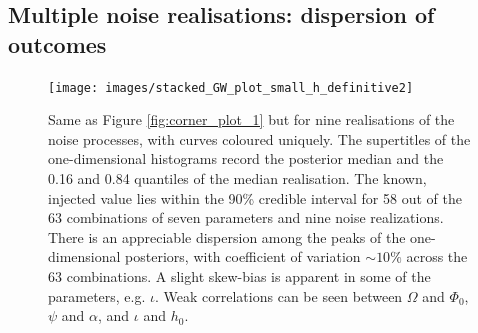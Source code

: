 \documentclass[fleqn,usenatbib,useAMS]{mnras}
\begin{document}



\subsection{Multiple noise realisations: dispersion of outcomes} \label{sec:multiple_noise}
\begin{figure}
	\texttt{[image: images/stacked\_GW\_plot\_small\_h\_definitive2]}
	\caption{Same as Figure \ref{fig:corner_plot_1} but for nine realisations of the noise processes, with curves coloured uniquely. The supertitles of the one-dimensional histograms record the posterior median and the 0.16 and 0.84 quantiles of the median realisation. The known, injected value lies within the 90\% credible interval for 58 out of the 63 combinations of seven parameters and nine noise realizations. There is an appreciable dispersion among the peaks of the one-dimensional posteriors, with coefficient of variation $\sim10 \%$ across the 63 combinations. A slight skew-bias is apparent in some of the parameters, e.g. $\iota$. Weak correlations can be seen between $\Omega$ and $\Phi_0$, $\psi$ and $\alpha$, and $\iota$ and $h_0$.} 
	\label{fig:corner_plot_2}
\end{figure}
\end{document}
